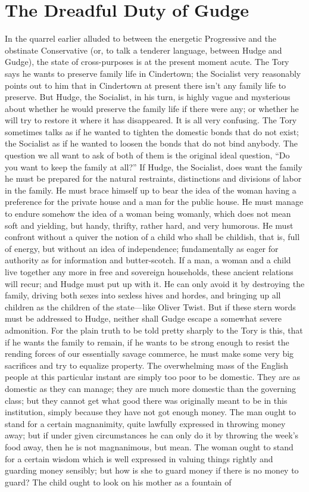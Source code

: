 \documentclass{book}
\begin{document}
\chapter{The Dreadful Duty of Gudge}
\label{chapter-49}
In the quarrel earlier alluded to between the energetic Progressive and the obstinate Conservative (or, to talk a tenderer language, between Hudge and Gudge), the state of cross-purposes is at the present moment acute. The Tory says he wants to preserve family life in Cindertown; the Socialist very reasonably points out to him that in Cindertown at present there isn’t any family life to preserve. But Hudge, the Socialist, in his turn, is highly vague and mysterious about whether he would preserve the family life if there were any; or whether he will try to restore it where it has disappeared. It is all very confusing. The Tory sometimes talks as if he wanted to tighten the domestic bonds that do not exist; the Socialist as if he wanted to loosen the bonds that do not bind anybody. The question we all want to ask of both of them is the original ideal question, “Do you want to keep the family at all?” If Hudge, the Socialist, does want the family he must be prepared for the natural restraints, distinctions and divisions of labor in the family. He must brace himself up to bear the idea of the woman having a preference for the private house and a man for the public house. He must manage to endure somehow the idea of a woman being womanly, which does not mean soft and yielding, but handy, thrifty, rather hard, and very humorous. He must confront without a quiver the notion of a child who shall be childish, that is, full of energy, but without an idea of independence; fundamentally as eager for authority as for information and butter-scotch. If a man, a woman and a child live together any more in free and sovereign households, these ancient relations will recur; and Hudge must put up with it. He can only avoid it by destroying the family, driving both sexes into sexless hives and hordes, and bringing up all children as the children of the state—like Oliver Twist. But if these stern words must be addressed to Hudge, neither shall Gudge escape a somewhat severe admonition. For the plain truth to be told pretty sharply to the Tory is this, that if he wants the family to remain, if he wants to be strong enough to resist the rending forces of our essentially savage commerce, he must make some very big sacrifices and try to equalize property. The overwhelming mass of the English people at this particular instant are simply too poor to be domestic. They are as domestic as they can manage; they are much more domestic than the governing class; but they cannot get what good there was originally meant to be in this institution, simply because they have not got enough money. The man ought to stand for a certain magnanimity, quite lawfully expressed in throwing money away; but if under given circumstances he can only do it by throwing the week’s food away, then he is not magnanimous, but mean. The woman ought to stand for a certain wisdom which is well expressed in valuing things rightly and guarding money sensibly; but how is she to guard money if there is no money to guard? The child ought to look on his mother as a fountain of 
\end{document}
